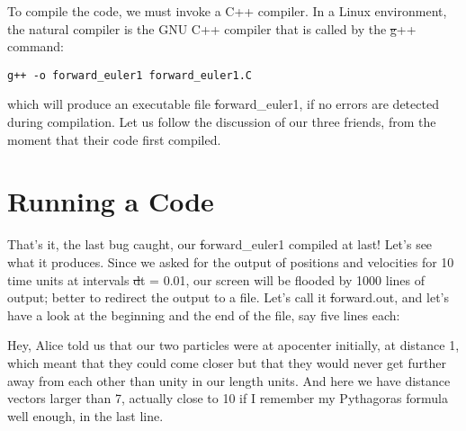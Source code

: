 To compile the code, we must invoke a C++ compiler.  In a Linux
environment, the natural compiler is the GNU C++ compiler that is
called by the {\st g++} command:

\begin{small}
\begin{verbatim}
g++ -o forward_euler1 forward_euler1.C
\end{verbatim}
\end{small}

which will produce an executable file {\st forward\_euler1}, if no
errors are detected during compilation.  Let us follow the discussion
of our three friends, from the moment that their code first compiled.

\section{Running a Code}

\abc

\carol
That's it, the last bug caught, our {\st forward\_euler1} compiled at
last!  Let's see what it produces.  Since we asked for the output of
positions and velocities for 10 time units at intervals {\st dt = 0.01},
our screen will be flooded by 1000 lines of output; better to redirect
the output to a file.  Let's call it {\st forward.out}, and let's have
a look at the beginning and the end of the file, say five lines each:

\cba

\abc

\bob
Hey, Alice told us that our two particles were at apocenter initially,
at distance 1, which meant that they could come closer but that they
would never get further away from each other than unity in our length
units.  And here we have distance vectors larger than 7, actually
close to 10 if I remember my Pythagoras formula well enough, in the
last line.

